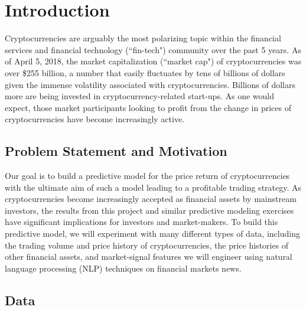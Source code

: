 \documentclass[12pt,twoside]{article}
\begin{document}
\newpage
\tableofcontents
\newpage
\setlength{\parindent}{0cm}

\section{Introduction}

Cryptocurrencies are arguably the most polarizing topic within the financial services and financial technology (``fin-tech") community over the past 5 years. As of April 5, 2018, the market capitalization (``market cap") of cryptocurrencies was over \$255 billion, a number that easily fluctuates by tens of billions of dollars given the immense volatility associated with cryptocurrencies. Billions of dollars more are being invested in cryptocurrency-related start-ups. As one would expect, those market participants looking to profit from the change in prices of cryptocurrencies have become increasingly active.

\subsection{Problem Statement and Motivation}

Our goal is to build a predictive model for the price return of cryptocurrencies with the ultimate aim of such a model leading to a profitable trading strategy. As cryptocurrencies become increasingly accepted as financial assets by mainstream investors, the results from this project and similar predictive modeling exercises have significant implications for investors and market-makers. To build this predictive model, we will experiment with many different types of data, including the trading volume and price history of cryptocurrencies, the price histories of other financial assets, and market-signal features we will engineer using natural language processing (NLP) techniques on financial markets news.

\subsection{Data}
\end{document}
